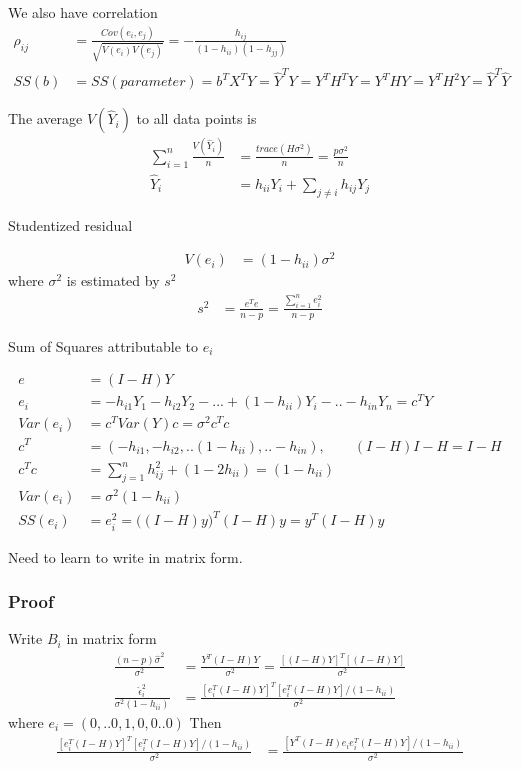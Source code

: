 We also have correlation
\begin{align*}
   \rho_{ij} &= \frac{Cov(e_i, e_j)}{\sqrt{V(e_i)V(e_j)}} = -\frac{h_{ij}}{(1-h_{ii}) (1-h_{jj})} \\
   SS(b) &= SS(parameter) = b^T X^T Y = \hat{Y}^T Y = Y^T H^T Y =  Y^T H Y =  Y^T H^2 Y = \hat{Y}^T \hat{Y}
\end{align*} 

The average $V(\hat{Y}_i)$ to all data points is
\begin{align*}
	\sum_{i=1}^n \frac{V(\hat{Y}_i)}{n} &= \frac{trace(H \sigma^2)}{n} = \frac{p \sigma^2}{n} \\
	\hat{Y}_i &= h_{ii}Y_i + \sum_{j \neq i} h_{ij} Y_j
\end{align*} 

Studentized residual

\begin{align*}
	 V(e_i) & = (1- h_{ii}) \sigma^2 
\end{align*} 
where $\sigma^2$ is estimated by $s^2$
\begin{align*}
 s^2 & = \frac{e^T e}{n-p} = \frac{\sum_{i=1}^n e_i^2}{n-p}
\end{align*} 

Sum of Squares attributable to $e_i$

\begin{align*}
	e & = (I-H)Y\\
	e_i &= -h_{i1} Y_1 - h_{i2} Y_2 - ... + (1- h_{ii}) Y_i -.. -h_{in} Y_n = c^T Y\\
	Var(e_i) &= c^T Var(Y) c = \sigma^2 c^T c \\
	c^T &= ( -h_{i1}, - h_{i2}, ..  (1- h_{ii}), .. -h_{in}), \qquad (I-H) I-H = I-H\\
	c^T c &= \sum_{j=1}^n h_{ij}^2 + (1- 2h_{ii}) = (1-h_{ii})\\
	Var(e_i) &=  \sigma^2 (1-h_{ii}) \\
	SS(e_i) &= {e_i^2} = \Big((I-H)y\Big)^T (I-H)y = y^T (I-H) y
\end{align*} 

Need to learn to write in matrix form. 



\subsubsection{Proof}
Write $B_i$ in matrix form
\begin{align*}
	\frac{(n-p)\hat{\sigma}^2 }{\sigma^2} &= \frac{Y^T (I-H) Y}{\sigma^2} = \frac{[(I-H)Y]^T [(I-H)Y]}{\sigma^2} \\
	\frac{\hat{\epsilon}_i^2}{\sigma^2(1-h_{ii})}&= \frac{[e_i^T (I-H)Y]^T [ e_i^T (I-H)Y]/(1- h_{ii})}{\sigma^2}
\end{align*}
where $e_i = (0,..0, 1, 0, 0..0)$ 
Then 
\begin{align*}
	\frac{[e_i^T (I-H)Y]^T [ e_i^T (I-H)Y]/(1- h_{ii})}{\sigma^2} & = \frac{[ Y^T (I-H) e_i e_i^T (I-H)Y]/(1- h_{ii})}{\sigma^2} 
\end{align*}

